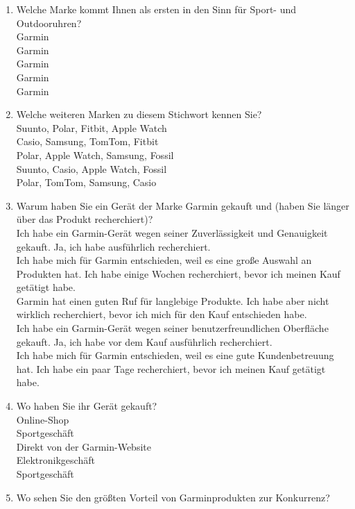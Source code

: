 \begin{enumerate}
    \item Welche Marke kommt Ihnen als ersten in den Sinn für Sport- und Outdooruhren? \\
    Garmin \\
    Garmin \\
    Garmin \\
    Garmin \\
    Garmin
    \item Welche weiteren Marken zu diesem Stichwort kennen Sie? \\
    Suunto, Polar, Fitbit, Apple Watch \\
    Casio, Samsung, TomTom, Fitbit \\
    Polar, Apple Watch, Samsung, Fossil \\
    Suunto, Casio, Apple Watch, Fossil \\
    Polar, TomTom, Samsung, Casio
    \item Warum haben Sie ein Gerät der Marke Garmin gekauft und (haben Sie länger über das Produkt recherchiert)? \\
    Ich habe ein Garmin-Gerät wegen seiner Zuverlässigkeit und Genauigkeit gekauft. Ja, ich habe ausführlich recherchiert. \\
    Ich habe mich für Garmin entschieden, weil es eine große Auswahl an Produkten hat. Ich habe einige Wochen recherchiert, bevor ich meinen Kauf getätigt habe. \\
    Garmin hat einen guten Ruf für langlebige Produkte. Ich habe aber nicht wirklich recherchiert, bevor ich mich für den Kauf entschieden habe. \\
    Ich habe ein Garmin-Gerät wegen seiner benutzerfreundlichen Oberfläche gekauft. Ja, ich habe vor dem Kauf ausführlich recherchiert. \\
    Ich habe mich für Garmin entschieden, weil es eine gute Kundenbetreuung hat. Ich habe ein paar Tage recherchiert, bevor ich meinen Kauf getätigt habe.
    \item Wo haben Sie ihr Gerät gekauft? \\
    Online-Shop \\
    Sportgeschäft \\
    Direkt von der Garmin-Website \\
    Elektronikgeschäft \\
    Sportgeschäft
    \item Wo sehen Sie den größten Vorteil von Garminprodukten zur Konkurrenz? \\

\end{enumerate}
